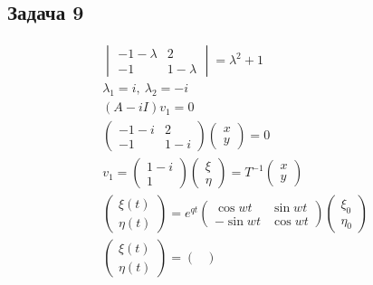 \subsection*{Задача 9}
\begin{figure}[!h]
	\begin{minipage}[h]{0.49\linewidth}
		\begin{gather*}
			\begin{vmatrix}
				-1 - \lambda & 2\\
				-1 & 1 - \lambda
			\end{vmatrix}
			=
			\lambda^2 + 1\\
			\lambda_1 = i,\ \lambda_2 = -i\\
			\left(A - iI\right)v_1 = 0\\
			\begin{pmatrix}
				-1-i & 2 \\ -1 & 1-i
			\end{pmatrix}
			\begin{pmatrix}
				x \\ y
			\end{pmatrix}
			= 0\\
			v_1 =
			\begin{pmatrix}
				1-i \\ 1
			\end{pmatrix}
			\begin{pmatrix}
				\xi \\ \eta
			\end{pmatrix}
			=
			T^{-1}
			\begin{pmatrix}
				x \\ y
			\end{pmatrix}\\
			\begin{pmatrix}
				\xi\left(t\right) \\ \eta\left(t\right)
			\end{pmatrix}
			= e^{qt}
			\begin{pmatrix}
				\cos wt & \sin wt \\
				-\sin wt & \cos wt
			\end{pmatrix}
			\begin{pmatrix}
				\xi_0 \\ \eta_0
			\end{pmatrix}\\
			\begin{pmatrix}
				\xi\left(t\right) \\ \eta\left(t\right)
			\end{pmatrix}
			=
			\begin{pmatrix}

\end{pmatrix}
\end{gather*}
\end{minipage}
\end{figure}
